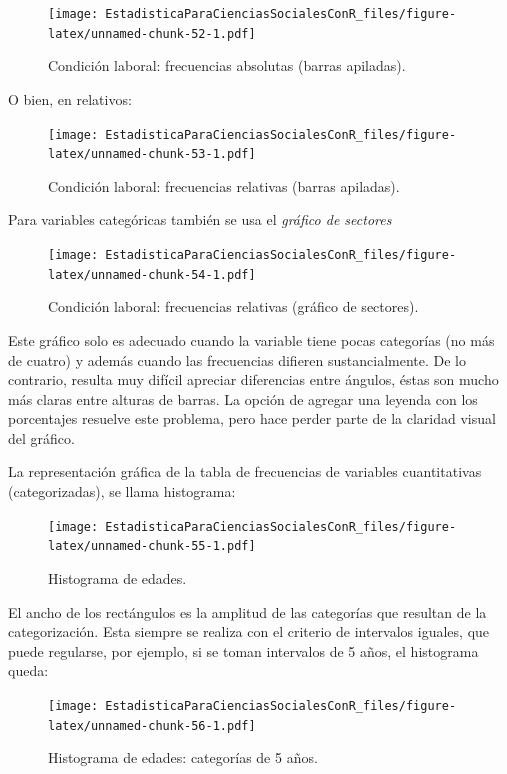 \documentclass[]{book}
\begin{document}
\begin{figure}
\centering
\texttt{[image: EstadisticaParaCienciasSocialesConR\_files/figure-latex/unnamed-chunk-52-1.pdf]}
\caption{\label{fig:unnamed-chunk-52}Condición laboral: frecuencias absolutas (barras apiladas).}
\end{figure}

O bien, en relativos:

\begin{figure}
\centering
\texttt{[image: EstadisticaParaCienciasSocialesConR\_files/figure-latex/unnamed-chunk-53-1.pdf]}
\caption{\label{fig:unnamed-chunk-53}Condición laboral: frecuencias relativas (barras apiladas).}
\end{figure}

Para variables categóricas también se usa el \emph{gráfico de sectores}

\begin{figure}
\centering
\texttt{[image: EstadisticaParaCienciasSocialesConR\_files/figure-latex/unnamed-chunk-54-1.pdf]}
\caption{\label{fig:unnamed-chunk-54}Condición laboral: frecuencias relativas (gráfico de sectores).}
\end{figure}

Este gráfico solo es adecuado cuando la variable tiene pocas categorías (no más de cuatro) y además cuando las frecuencias difieren sustancialmente. De lo contrario, resulta muy difícil apreciar diferencias entre ángulos, éstas son mucho más claras entre alturas de barras. La opción de agregar una leyenda con los porcentajes resuelve este problema, pero hace perder parte de la claridad visual del gráfico.

La representación gráfica de la tabla de frecuencias de variables cuantitativas (categorizadas), se llama histograma:

\begin{figure}
\centering
\texttt{[image: EstadisticaParaCienciasSocialesConR\_files/figure-latex/unnamed-chunk-55-1.pdf]}
\caption{\label{fig:unnamed-chunk-55}Histograma de edades.}
\end{figure}

El ancho de los rectángulos es la amplitud de las categorías que resultan de la categorización. Esta siempre se realiza con el criterio de intervalos iguales, que puede regularse, por ejemplo, si se toman intervalos de 5 años, el histograma queda:

\begin{figure}
\centering
\texttt{[image: EstadisticaParaCienciasSocialesConR\_files/figure-latex/unnamed-chunk-56-1.pdf]}
\caption{\label{fig:unnamed-chunk-56}Histograma de edades: categorías de 5 años.}
\end{figure}
\end{document}
